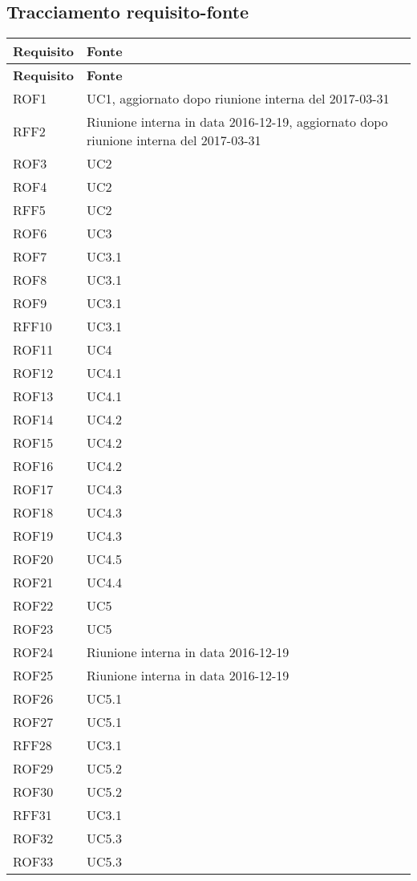 \documentclass[../AnalisiDeiRequisiti_v3.0.0.tex]{subfiles}
\begin{document}
\subsection{Tracciamento requisito-fonte}
\def\arraystretch{1.5}
\begin{longtable}{p{4cm}!{\VRule[1pt]}p{4cm}}
\color{white} \textbf{Requisito} & \color{white} \textbf{Fonte} \\ 
\endfirsthead 
{} 
\color{white} \textbf{Requisito} & \color{white} \textbf{Fonte} \\ 
\endhead 
ROF1 & UC1, aggiornato dopo riunione interna del 2017-03-31\\
RFF2 & Riunione interna in data 2016-12-19, aggiornato dopo riunione interna del 2017-03-31 \\
ROF3 & UC2 \\
ROF4 & UC2 \\
RFF5 & UC2 \\
ROF6 & UC3 \\
ROF7 & UC3.1 \\
ROF8 & UC3.1 \\
ROF9 & UC3.1 \\
RFF10 & UC3.1 \\
ROF11 & UC4 \\
ROF12 & UC4.1 \\
ROF13 & UC4.1 \\
ROF14 & UC4.2 \\
ROF15 & UC4.2 \\
ROF16 & UC4.2 \\
ROF17 & UC4.3 \\
ROF18 & UC4.3 \\
ROF19 & UC4.3 \\
ROF20 & UC4.5 \\
ROF21 & UC4.4 \\
ROF22 & UC5 \\
ROF23 & UC5 \\
ROF24 & Riunione interna in data 2016-12-19 \\
ROF25 & Riunione interna in data 2016-12-19 \\
ROF26 & UC5.1 \\
ROF27 & UC5.1 \\
RFF28 & UC3.1 \\
ROF29 & UC5.2 \\
ROF30 & UC5.2 \\
RFF31 & UC3.1 \\
ROF32 & UC5.3 \\
ROF33 & UC5.3 \\

\end{longtable}
\end{document}
